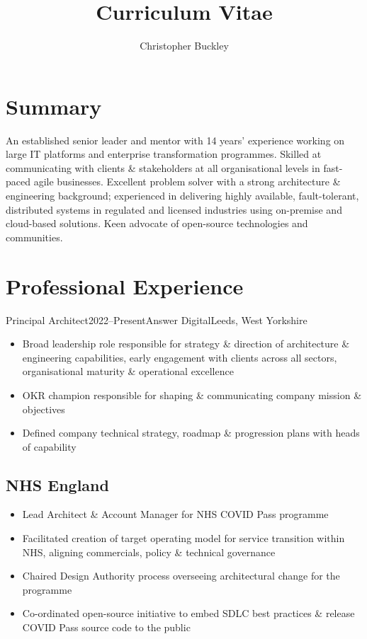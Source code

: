 \documentclass{cv}
\title{Curriculum Vitae}
\author{Christopher Buckley}
\begin{document}

\section{Summary}

An established senior leader and mentor with 14 years' experience working on large IT platforms and
enterprise transformation programmes. Skilled at communicating with clients \& stakeholders at all
organisational levels in fast-paced agile businesses. Excellent problem solver with a strong
architecture \& engineering background; experienced in delivering highly available, fault-tolerant,
distributed systems in regulated and licensed industries using on-premise and cloud-based solutions.
Keen advocate of open-source technologies and communities.


\section{Professional Experience}

\begin{experienceplain}{Principal Architect}{2022--Present}{Answer Digital}{Leeds, West Yorkshire}
\begin{itemize}
\item Broad leadership role responsible for strategy \& direction of architecture \& engineering capabilities,
    early engagement with clients across all sectors, organisational maturity \& operational excellence
\item OKR champion responsible for shaping \& communicating company mission \& objectives
\item Defined company technical strategy, roadmap \& progression plans with heads of capability
\end{itemize}

\subsection{NHS England}
\begin{itemize}
\item Lead Architect \& Account Manager for NHS COVID Pass programme
\item Facilitated creation of target operating model for service transition within NHS, aligning commercials,
      policy \& technical governance
\item Chaired Design Authority process overseeing architectural change for the programme
\item Co-ordinated open-source initiative to embed SDLC best practices \& release COVID Pass source code
      to the public
\end{itemize}
\end{experienceplain}
\end{document}
